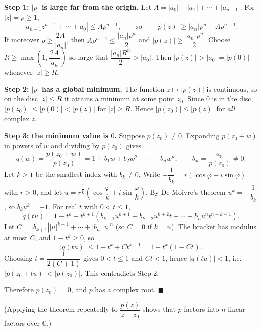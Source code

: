 \textbf{Step 1: $|p|$ is large far from the origin.} Let $A=|a_0|+|a_1|+\cdots+|a_{n-1}|$. For $|z|=\rho\ge1$,
\[\left|a_{n-1}z^{n-1}+\cdots+a_0\right|\le A\rho^{n-1},\qquad\text{so}\qquad|p(z)|\ge|a_n|\rho^n-A\rho^{n-1}.\]
If moreover $\rho\ge\dfrac{2A}{|a_n|}$, then $A\rho^{n-1}\le\dfrac{|a_n|\rho^n}{2}$ and $|p(z)|\ge\dfrac{|a_n|\rho^n}{2}$. Choose $R\ge\max\left(1,\dfrac{2A}{|a_n|}\right)$ so large that $\dfrac{|a_n|R^n}{2}>|a_0|$. Then $|p(z)|>|a_0|=|p(0)|$ whenever $|z|\ge R$.

\textbf{Step 2: $|p|$ has a global minimum.} The function $z\mapsto|p(z)|$ is continuous, so on the disc $|z|\le R$ it attains a minimum at some point $z_0$. Since $0$ is in the disc, $|p(z_0)|\le|p(0)|<|p(z)|$ for $|z|\ge R$. Hence $|p(z_0)|\le|p(z)|$ for \emph{all} complex $z$.

\textbf{Step 3: the minimum value is $0$.} Suppose $p(z_0)\ne0$. Expanding $p(z_0+w)$ in powers of $w$ and dividing by $p(z_0)$ gives
\[q(w)=\dfrac{p(z_0+w)}{p(z_0)}=1+b_1w+b_2w^2+\cdots+b_nw^n,\qquad b_n=\dfrac{a_n}{p(z_0)}\ne0.\]
Let $k\ge1$ be the smallest index with $b_k\ne0$. Write $-\dfrac{1}{b_k}=r(\cos\varphi+i\sin\varphi)$ with $r>0$, and let $u=r^{\dfrac1k}\left(\cos\dfrac{\varphi}{k}+i\sin\dfrac{\varphi}{k}\right)$. By De Moivre's theorem $u^k=-\dfrac{1}{b_k}$, so $b_ku^k=-1$. For real $t$ with $0<t\le1$,
\[q(tu)=1-t^k+t^{k+1}\left(b_{k+1}u^{k+1}+b_{k+2}u^{k+2}t+\cdots+b_nu^nt^{n-k-1}\right).\]
Let $C=|b_{k+1}||u|^{k+1}+\cdots+|b_n||u|^n$ (so $C=0$ if $k=n$). The bracket has modulus at most $C$, and $1-t^k\ge0$, so
\[|q(tu)|\le1-t^k+Ct^{k+1}=1-t^k(1-Ct).\]
Choosing $t=\dfrac{1}{2(C+1)}$ gives $0<t\le1$ and $Ct<1$, hence $|q(tu)|<1$, i.e. $|p(z_0+tu)|<|p(z_0)|$. This contradicts Step 2.

Therefore $p(z_0)=0$, and $p$ has a complex root. $\blacksquare$

(Applying the theorem repeatedly to $\dfrac{p(z)}{z-z_0}$ shows that $p$ factors into $n$ linear factors over $\mathbb C$.)
